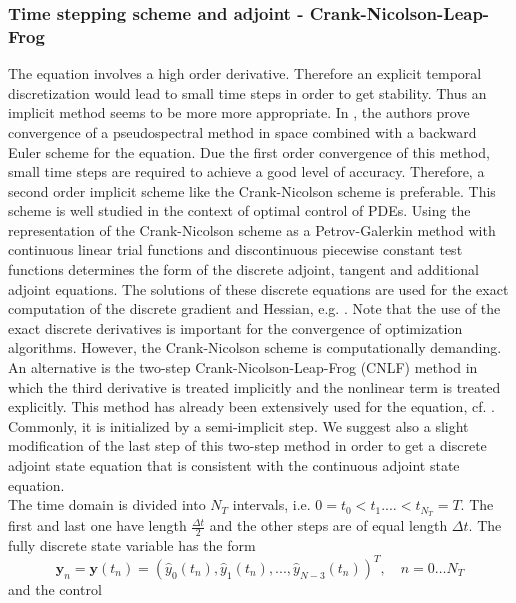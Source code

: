 \subsubsection{Time stepping scheme and adjoint - Crank-Nicolson-Leap-Frog}
\label{numadjoint}
The \KdVB equation involves a high order derivative. Therefore an explicit temporal discretization would lead to small time steps in order to get stability. Thus an implicit method seems to be more more appropriate. In \cite{li2000error}, the authors prove convergence of a pseudospectral method in space combined with a backward Euler scheme for the \KdV equation. Due the first order convergence of this method, small time steps are required to achieve a good level of accuracy. Therefore, a second order implicit scheme like the Crank-Nicolson scheme is preferable. This scheme is well studied in the context of optimal control of PDEs. Using the representation of the Crank-Nicolson scheme as a Petrov-Galerkin method with continuous linear trial functions and discontinuous piecewise constant test functions determines the form of the discrete adjoint, tangent and additional adjoint equations. The solutions of these discrete equations are used for the exact computation of the discrete gradient and Hessian, e.g. \cite{meidner2007adaptive}. Note that the use of the exact discrete derivatives is important for the convergence of optimization algorithms. However, the Crank-Nicolson scheme is computationally demanding. An alternative is the two-step Crank-Nicolson-Leap-Frog (CNLF) method in which the third derivative is treated implicitly and the nonlinear term is treated explicitly. This method has already been extensively used for the \KdV equation, cf. \cite{shen2003new,ma2000legendre,ma2001optimal}.
Commonly, it is initialized by a semi-implicit step. We suggest also a slight modification of the last step of this two-step method in order to get a discrete adjoint state equation that is consistent with the continuous adjoint state equation.\\
The time domain is divided into $N_{T}$ intervals, i.e. $0 = t_0 < t_1....< t_{N_{T}} = T$. The first and last one have length $\frac{\Delta t}{2}$ and the other steps are of equal length $\Delta t$. The fully discrete state variable has the form
$$\mathbf{y}_n = \mathbf{y}(t_n) = \left( \hat y_0(t_n), \hat y_1(t_n), ..., \hat y_{N-3}(t_n)\right)^T,  \quad  n=0 \ldots N_{T}$$ and the control
